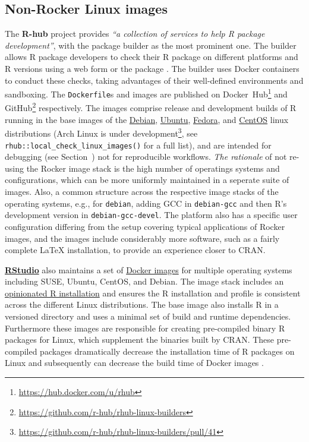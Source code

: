 \hypertarget{non-rocker-linux-images}{%
\subsection{Non-Rocker Linux images}\label{non-rocker-linux-images}}

\label{nondebian}

\label{rhub} The \textbf{R-hub} project provides \emph{``a collection of
services to help R package development''}, with the package builder as
the most prominent one\citep{r-hub_docs_2019}. The builder allows R
package developers to check their R package on different platforms and R
versions using a web form or the package 
\citep{csardi_rhub_2019}. The builder uses Docker containers to conduct
these checks, taking advantages of their well-defined environments and
sandboxing. The \texttt{Dockerfile}s and images are published on
Docker~Hub\footnote{\href{https://hub.docker.com/u/rhub}{https://hub.docker.com/u/rhub}}
and
GitHub\footnote{\href{https://github.com/r-hub/rhub-linux-builders}{https://github.com/r-hub/rhub-linux-builders}}
respectively. The images comprise release and development builds of R
running in the base images of the
\href{https://www.debian.org/}{Debian},
\href{https://ubuntu.com/}{Ubuntu},
\href{https://getfedora.org/}{Fedora}, and
\href{https://centos.org/}{CentOS} linux distributions (Arch Linux is
under
development\footnote{\href{https://github.com/r-hub/rhub-linux-builders/pull/41}{https://github.com/r-hub/rhub-linux-builders/pull/41}},
see \texttt{rhub::local\_check\_linux\_images()} for a full list), and
are intended for debugging (see Section~) not for
reproducible workflows. \emph{The rationale} of not re-using the Rocker
image stack is the high number of operatings systems and configurations,
which can be more uniformly maintained in a seperate suite of images.
Also, a common structure across the respective image stacks of the
operating systems, e.g., for \texttt{debian}, adding GCC in
\texttt{debian-gcc} and then R's development version in
\texttt{debian-gcc-devel}. The platform also has a specific user
configuration differing from the setup covering typical applications of
Rocker images, and the images include considerably more software, such
as a fairly complete LaTeX installation, to provide an experience closer
to CRAN.

\href{https://rstudio.com/}{\textbf{RStudio}} also maintains a set of
\href{https://github.com/rstudio/r-docker}{Docker images} for multiple
operating systems including SUSE, Ubuntu, CentOS, and Debian. The image
stack includes an \href{https://github.com/rstudio/r-builds}{opinionated
R installation} and ensures the R installation and profile is consistent
across the different Linux distributions. The base image also installs R
in a versioned directory and uses a minimal set of build and runtime
dependencies. Furthermore these images are responsible for creating
pre-compiled binary R packages for Linux, which supplement the binaries
built by CRAN. These pre-compiled packages dramatically decrease the
installation time of R packages on Linux and subsequently can decrease
the build time of Docker images \citep{lopp_package_2019}.

